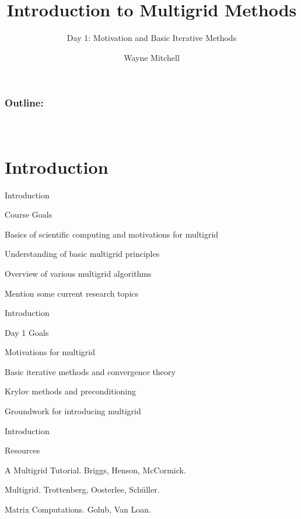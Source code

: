 \documentclass[18pt,xcolor=table]{beamer}
\title[Multigrid]{Introduction to Multigrid Methods}
\subtitle{Day 1: Motivation and Basic Iterative Methods}
\author[Mitchell]{Wayne Mitchell}
\institute{\pgfuseimage{logo}\\Universit\"at Heidelberg\\Institut f\"ur Technische Informatik}
\date[]{\alert{}}
\begin{document}


\DeclareRobustCommand{\Chi}{\raisebox{2pt}{$\chi$}}

\begin{frame}
\frametitle{\bf Outline:}
\framesubtitle{~~}
\tableofcontents
\end{frame}


\section{Introduction}

\begin{frame}{Introduction}
\begin{block}{Course Goals}
\bit
\item Basics of scientific computing and motivations for multigrid
\item Understanding of basic multigrid principles
\item Overview of various multigrid algorithms
\item Mention some current research topics
\eit
\end{block}
\end{frame}

\begin{frame}{Introduction}
\begin{block}{Day 1 Goals}
\bit
\item Motivations for multigrid
\item Basic iterative methods and convergence theory
\item Krylov methods and preconditioning
\item Groundwork for introducing multigrid
\eit
\end{block}
\end{frame}

\begin{frame}{Introduction}
\begin{block}{Resources}
\bit
\item A Multigrid Tutorial. Briggs, Henson, McCormick.
\item Multigrid. Trottenberg, Oosterlee, Sch\"uller.
\item Matrix Computations. Golub, Van Loan.
\eit
\end{block}
\end{frame}
\end{document}
